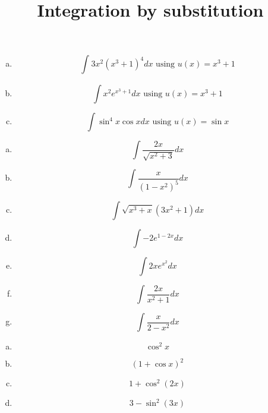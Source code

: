 \documentclass[12pt]{article}
\begin{document}
\title{Integration by substitution}
\maketitle



 \n
{}

\begin{enumerate}[a) ]
\item $$ \int_{}3x^2(x^3+1)^4dx \text{ using } u(x)=x^3+1$$

\item
$$
\int x^2e^{x^3+1}dx \text{ using } u(x)=x^3+1
$$

\item
$$
\int \sin^4x\cos xdx \text{ using } u(x)=\sin x
$$
\end{enumerate}

\bigskip

\bigskip


 \n
{}

\begin{enumerate}[a) ]
\item
$$
\int{\frac{2x}{\sqrt{x^2+3 }}}dx
$$

\item
$$
\int \frac{x}{(1-x^2)^5}dx
$$

\item
$$
\int \sqrt{ x^3+x}(3x^2+1)dx
$$

\item
$$
\int-2e^{1-2x}dx
$$

\item
$$
\int{2xe^{x^2}}dx
$$

\item
$$
\int{\frac{2x}{x^2+1}}dx
$$

\item
$$
\int \frac{x}{2-x^2}dx
$$
\end{enumerate}





 \n
{}

\begin{enumerate}[a) ]
\item 
$$
\cos^2x
$$

\item 
$$
(1+\cos x)^2
$$

\item 
$$
1+\cos^2(2x)
$$

\item 
$$
3-\sin^2(3x)
$$
\end{enumerate}
\end{document}
